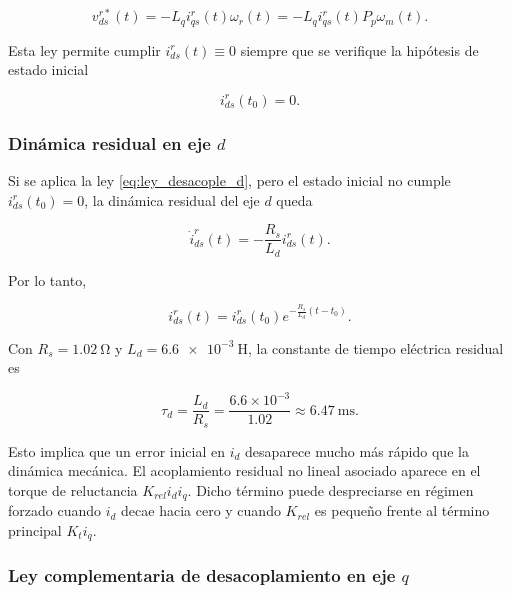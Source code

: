 \documentclass[10pt,a4paper]{article}
\begin{document}
\begin{equation}
    \boxed{
    v_{ds}^{r*}(t)
    =
    -L_q i_{qs}^{r}(t)\omega_r(t)
    =
    -L_q i_{qs}^{r}(t)P_p\omega_m(t)
    }.
    \label{eq:ley_desacople_d}
\end{equation}

Esta ley permite cumplir \(i_{ds}^{r}(t)\equiv0\) siempre que se verifique la hipótesis de estado inicial

\begin{equation}
    i_{ds}^{r}(t_0)=0.
    \label{eq:hipotesis_id0}
\end{equation}

\subsubsection{Dinámica residual en eje \(d\)}

Si se aplica la ley \eqref{eq:ley_desacople_d}, pero el estado inicial no cumple \(i_{ds}^{r}(t_0)=0\), la dinámica residual del eje \(d\) queda

\begin{equation}
    \dot{i}_{ds}^{r}(t)
    =
    -\frac{R_s}{L_d}i_{ds}^{r}(t).
    \label{eq:dinamica_residual_id}
\end{equation}

Por lo tanto,

\begin{equation}
    i_{ds}^{r}(t)
    =
    i_{ds}^{r}(t_0)e^{-\frac{R_s}{L_d}(t-t_0)}.
    \label{eq:solucion_residual_id}
\end{equation}

Con \(R_s=\SI{1.02}{\ohm}\) y \(L_d=\SI{6.6e-3}{\henry}\), la constante de tiempo eléctrica residual es

\begin{equation}
    \tau_d=\frac{L_d}{R_s}=\frac{6.6\times10^{-3}}{1.02}\approx\SI{6.47}{\milli\second}.
    \label{eq:tau_d_residual}
\end{equation}

Esto implica que un error inicial en \(i_d\) desaparece mucho más rápido que la dinámica mecánica. El acoplamiento residual no lineal asociado aparece en el torque de reluctancia \(K_{rel}i_d i_q\). Dicho término puede despreciarse en régimen forzado cuando \(i_d\) decae hacia cero y cuando \(K_{rel}\) es pequeño frente al término principal \(K_t i_q\).

\subsubsection{Ley complementaria de desacoplamiento en eje \(q\)}
\end{document}
